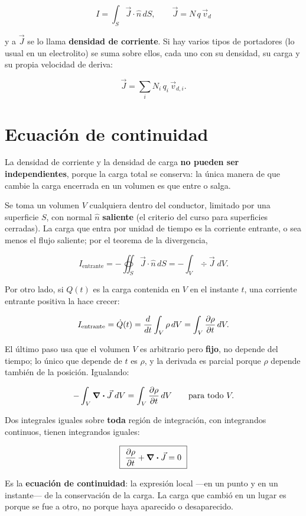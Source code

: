 \documentclass[12pt,a4paper]{article}
\begin{document}
\begin{keybox}
\[
\boxed{\ I = \int_S \vec J\cdot\hat n\,dS,
\qquad \vec J = N\,q\,\vec v_d\ }
\]
\end{keybox}
y a $\vec J$ se lo llama \textbf{densidad de corriente}. Si hay varios tipos de
portadores (lo usual en un electrolito) se suma sobre ellos, cada uno con su
densidad, su carga y su propia velocidad de deriva:

\[
\vec J = \sum_i N_i\,q_i\,\vec v_{d,i} .
\]

\section{Ecuación de continuidad}

La densidad de corriente y la densidad de carga \textbf{no pueden ser
independientes}, porque la carga total se conserva: la única manera de que
cambie la carga encerrada en un volumen es que entre o salga.

Se toma un volumen $V$ cualquiera dentro del conductor, limitado por una
superficie $S$, con normal $\hat n$ \textbf{saliente} (el criterio del curso para
superficies cerradas). La carga que entra por unidad de tiempo es la corriente
entrante, o sea menos el flujo saliente; por el teorema de la divergencia,

\[
I_{\text{entrante}} = -\oiint_S \vec J\cdot\hat n\,dS
= -\int_V \div \vec J\;dV .
\]

Por otro lado, si $Q(t)$ es la carga contenida en $V$ en el instante $t$, una
corriente entrante positiva la hace crecer:

\[
I_{\text{entrante}} = \dot Q(t) = \frac{d}{dt}\int_V \rho\,dV
= \int_V \pdv{\rho}{t}\,dV .
\]

El último paso usa que el volumen $V$ es arbitrario pero \textbf{fijo}, no depende
del tiempo; lo único que depende de $t$ es $\rho$, y la derivada es parcial
porque $\rho$ depende también de la posición. Igualando:

\[
-\int_V \div \vec J\;dV = \int_V \pdv{\rho}{t}\,dV
\qquad \text{para todo } V .
\]

Dos integrales iguales sobre \textbf{toda} región de integración, con integrandos
continuos, tienen integrandos iguales:

\begin{keybox}
\[
\boxed{\ \pdv{\rho}{t} + \div \vec J = 0\ }
\]
\end{keybox}

Es la \textbf{ecuación de continuidad}: la expresión local ---en un punto y en un
instante--- de la conservación de la carga. La carga que cambió en un lugar es
porque se fue a otro, no porque haya aparecido o desaparecido.
\end{document}
